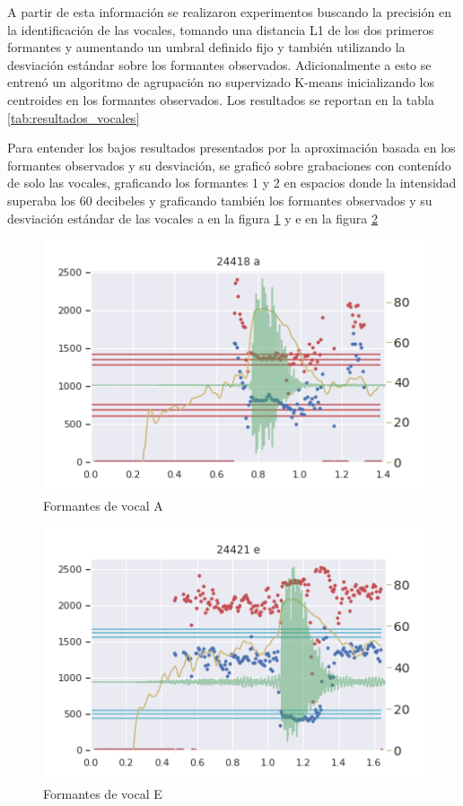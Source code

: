 A partir de esta información se realizaron experimentos buscando la precisión en la identificación de las vocales, tomando una distancia L1 de los dos primeros formantes y aumentando un umbral definido fijo y también utilizando la desviación estándar sobre los formantes observados. Adicionalmente a esto se entrenó un algoritmo de agrupación no supervizado K-means inicializando los centroides en los formantes observados. Los resultados se reportan en la tabla \ref{tab:resultados_vocales}




Para entender los bajos resultados presentados por la aproximación basada en los formantes observados y su desviación, se graficó sobre grabaciones con contenído de solo las vocales, graficando los formantes 1 y 2 en espacios donde la intensidad superaba los 60 decibeles y graficando también los formantes observados y su desviación estándar de las vocales a en la figura \ref{img:formantes_a} y e en la figura \ref{img:formantes_e}

\begin{figure}[H]
\caption{Formantes de vocal A}
\label{img:formantes_a}
\includegraphics[width=\textwidth]{imagenes/04_02_a.png}
\end{figure}

\begin{figure}[H]
\caption{Formantes de vocal E}
\label{img:formantes_e}
\includegraphics[width=\textwidth]{imagenes/04_02_e.png}
\end{figure}

